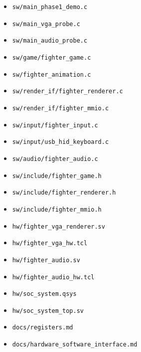 \documentclass[12pt,a4paper]{article}
\begin{document}
\begin{itemize}
  \item \texttt{sw/main\_phase1\_demo.c}
  \item \texttt{sw/main\_vga\_probe.c}
  \item \texttt{sw/main\_audio\_probe.c}
  \item \texttt{sw/game/fighter\_game.c}
  \item \texttt{sw/fighter\_animation.c}
  \item \texttt{sw/render\_if/fighter\_renderer.c}
  \item \texttt{sw/render\_if/fighter\_mmio.c}
  \item \texttt{sw/input/fighter\_input.c}
  \item \texttt{sw/input/usb\_hid\_keyboard.c}
  \item \texttt{sw/audio/fighter\_audio.c}
  \item \texttt{sw/include/fighter\_game.h}
  \item \texttt{sw/include/fighter\_renderer.h}
  \item \texttt{sw/include/fighter\_mmio.h}
  \item \texttt{hw/fighter\_vga\_renderer.sv}
  \item \texttt{hw/fighter\_vga\_hw.tcl}
  \item \texttt{hw/fighter\_audio.sv}
  \item \texttt{hw/fighter\_audio\_hw.tcl}
  \item \texttt{hw/soc\_system.qsys}
  \item \texttt{hw/soc\_system\_top.sv}
  \item \texttt{docs/registers.md}
  \item \texttt{docs/hardware\_software\_interface.md}
\end{itemize}
\end{document}

